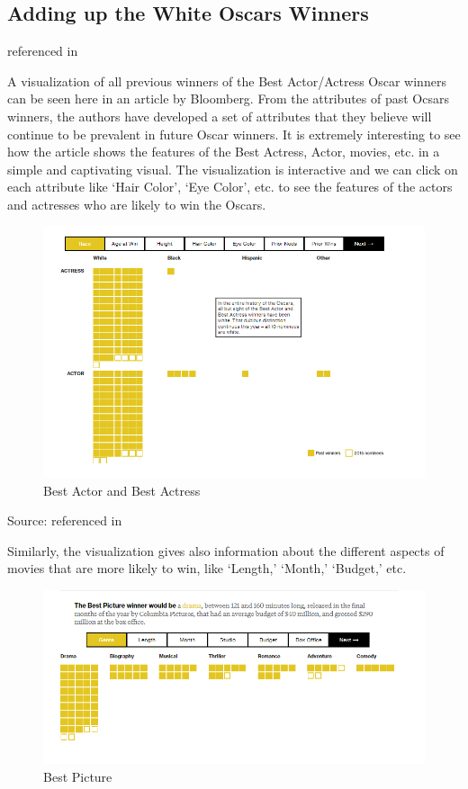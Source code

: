 \documentclass[]{book}
\theoremstyle{definition}
\theoremstyle{definition}
\theoremstyle{definition}
\theoremstyle{remark}
\begin{document}
\subsection{Adding up the White Oscars
Winners}\label{adding-up-the-white-oscars-winners}

\citep{oscars_sowhite_chart} referenced in \citep{int_viz_2}

A visualization of all previous winners of the Best Actor/Actress Oscar
winners can be seen here \citep{oscars_sowhite_chart} in an article by
Bloomberg. From the attributes of past Ocsars winners, the authors have
developed a set of attributes that they believe will continue to be
prevalent in future Oscar winners. It is extremely interesting to see
how the article shows the features of the Best Actress, Actor, movies,
etc. in a simple and captivating visual. The visualization is
interactive and we can click on each attribute like `Hair Color', `Eye
Color', etc. to see the features of the actors and actresses who are
likely to win the Oscars.

\begin{figure}
\centering
\includegraphics{images/img_oscars_actors.PNG}
\caption{Best Actor and Best Actress}
\end{figure}

Source: \citep{oscars_sowhite_chart} referenced in \citep{int_viz_2}

Similarly, the visualization gives also information about the different
aspects of movies that are more likely to win, like `Length,' `Month,'
`Budget,' etc.

\begin{figure}
\centering
\includegraphics{images/img_oscars_pic.PNG}
\caption{Best Picture}
\end{figure}
\end{document}
